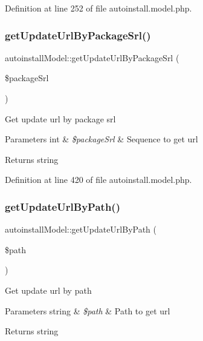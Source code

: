 Definition at line 252 of file autoinstall.\+model.\+php.

\mbox{\label{classautoinstallModel_a20c447d210dff0edc286007b92ec881f}} 
\subsubsection{\texorpdfstring{get\+Update\+Url\+By\+Package\+Srl()}{getUpdateUrlByPackageSrl()}}
{\footnotesize\ttfamily autoinstall\+Model\+::get\+Update\+Url\+By\+Package\+Srl (\begin{DoxyParamCaption}\item[{}]{\$package\+Srl }\end{DoxyParamCaption})}

Get update url by package srl


\begin{DoxyParams}[1]{Parameters}
int & {\em \$package\+Srl} & Sequence to get url \\
\hline
\end{DoxyParams}
\begin{DoxyReturn}{Returns}
string 
\end{DoxyReturn}


Definition at line 420 of file autoinstall.\+model.\+php.

\mbox{\label{classautoinstallModel_a560f4c8850324ee4e0c3dc74573bc7d9}} 
\subsubsection{\texorpdfstring{get\+Update\+Url\+By\+Path()}{getUpdateUrlByPath()}}
{\footnotesize\ttfamily autoinstall\+Model\+::get\+Update\+Url\+By\+Path (\begin{DoxyParamCaption}\item[{}]{\$path }\end{DoxyParamCaption})}

Get update url by path


\begin{DoxyParams}[1]{Parameters}
string & {\em \$path} & Path to get url \\
\hline
\end{DoxyParams}
\begin{DoxyReturn}{Returns}
string 
\end{DoxyReturn}


